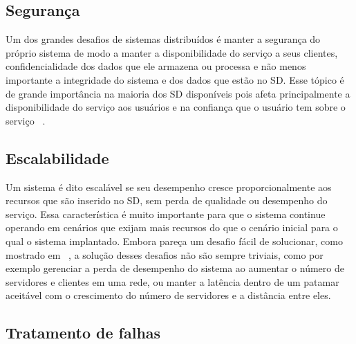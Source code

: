     \subsection{Segurança}
        Um dos grandes desafios de sistemas distribuídos é manter a segurança do próprio sistema de modo a manter a disponibilidade do serviço a seus clientes, confidencialidade dos dados que ele armazena ou processa e não menos importante a integridade do sistema e dos dados que estão no SD. Esse tópico é de grande importância na maioria dos SD disponíveis pois afeta principalmente a disponibilidade do serviço aos usuários e na confiança que o usuário tem sobre o serviço ~\cite{coulouris}.
    
    \subsection{Escalabilidade}
        Um sistema é dito escalável se seu desempenho cresce proporcionalmente aos recursos que são inserido no SD, sem perda de qualidade ou desempenho do serviço. Essa característica é muito importante para que o sistema continue operando em cenários que exijam mais recursos do que o cenário inicial para o qual o sistema implantado. Embora pareça um desafio fácil de solucionar, como mostrado em ~\cite{coulouris}, a solução desses desafios não são sempre triviais, como por exemplo gerenciar a perda de desempenho do sistema ao aumentar o número de servidores e clientes em uma rede, ou manter a latência dentro de um patamar aceitável com o crescimento do número de servidores e a distância entre eles.
    
    \subsection{Tratamento de falhas}

